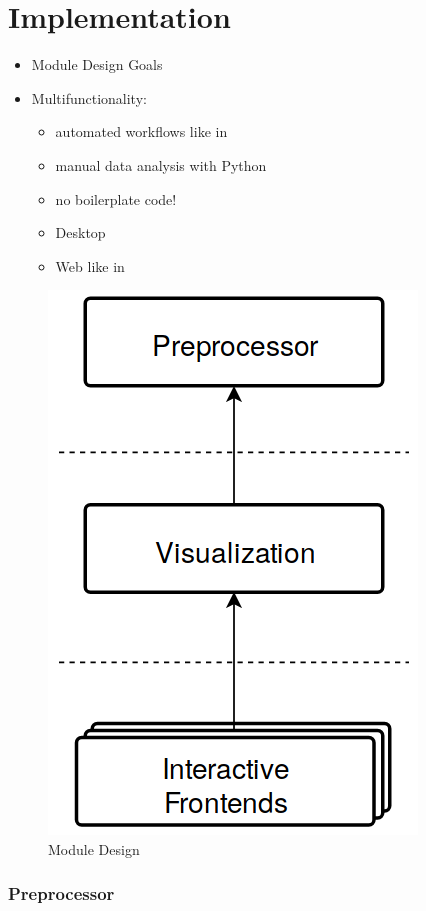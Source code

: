 
\chapter{Implementation}
\label{chap:implementation}


\begin{itemize}
\item Module Design Goals
\item Multifunctionality:
    \begin{itemize}            
    \item automated workflows like in \logoAiida{}
    \item manual data analysis with Python
    \end{itemize}
    \begin{itemize}
    \item no boilerplate code!
    \end{itemize}
    \begin{itemize}
    \item Desktop \faDesktop{}
    \item Web \faServer{} \faArrowRight{} \faGlobe{} like in \logoAiidalab{}
    \end{itemize}
\end{itemize}

\begin{figure}[htb!]
    \centering
    \includegraphics[width=0.3\linewidth]{img/module_design.png}
    \caption{Module Design}
    \label{fig:modules}
\end{figure}


\subsection{Preprocessor}
\label{sec:preprocessor}


